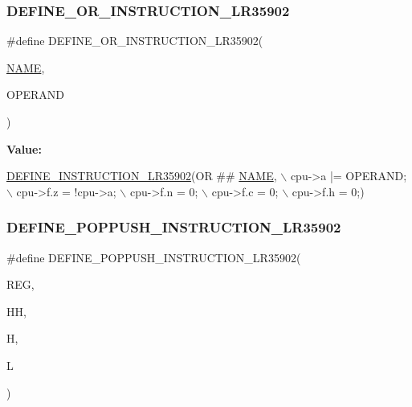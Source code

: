\subsubsection{\texorpdfstring{D\+E\+F\+I\+N\+E\+\_\+\+O\+R\+\_\+\+I\+N\+S\+T\+R\+U\+C\+T\+I\+O\+N\+\_\+\+L\+R35902}{DEFINE\_OR\_INSTRUCTION\_LR35902}}
{\footnotesize\ttfamily \#define D\+E\+F\+I\+N\+E\+\_\+\+O\+R\+\_\+\+I\+N\+S\+T\+R\+U\+C\+T\+I\+O\+N\+\_\+\+L\+R35902(\begin{DoxyParamCaption}\item[{}]{\mbox{\hyperlink{inflate_8h_a164ea0159d5f0b5f12a646f25f99eceaa67bc2ced260a8e43805d2480a785d312}{N\+A\+ME}},  }\item[{}]{O\+P\+E\+R\+A\+ND }\end{DoxyParamCaption})}

{\bfseries Value\+:}
\begin{DoxyCode}
\mbox{\hyperlink{isa-lr35902_8c_a3128fc43c5d01e8b51f67901c0b4b5ef}{DEFINE\_INSTRUCTION\_LR35902}}(OR ## \mbox{\hyperlink{inflate_8h_a164ea0159d5f0b5f12a646f25f99eceaa67bc2ced260a8e43805d2480a785d312}{NAME}}, \(\backslash\)
        cpu->a |= OPERAND; \(\backslash\)
        cpu->f.z = !cpu->a; \(\backslash\)
        cpu->f.n = 0; \(\backslash\)
        cpu->f.c = 0; \(\backslash\)
        cpu->f.h = 0;)
\end{DoxyCode}
\mbox{\label{isa-lr35902_8c_ae0a0a8b08942c9f7ba2a696dbf51449e}} 
\subsubsection{\texorpdfstring{D\+E\+F\+I\+N\+E\+\_\+\+P\+O\+P\+P\+U\+S\+H\+\_\+\+I\+N\+S\+T\+R\+U\+C\+T\+I\+O\+N\+\_\+\+L\+R35902}{DEFINE\_POPPUSH\_INSTRUCTION\_LR35902}}
{\footnotesize\ttfamily \#define D\+E\+F\+I\+N\+E\+\_\+\+P\+O\+P\+P\+U\+S\+H\+\_\+\+I\+N\+S\+T\+R\+U\+C\+T\+I\+O\+N\+\_\+\+L\+R35902(\begin{DoxyParamCaption}\item[{}]{R\+EG,  }\item[{}]{HH,  }\item[{}]{H,  }\item[{}]{L }\end{DoxyParamCaption})}

